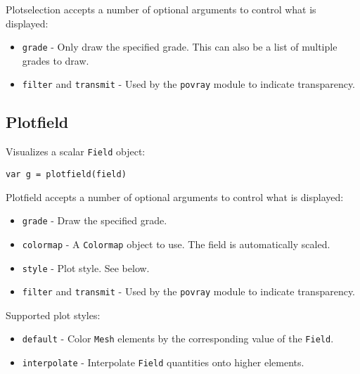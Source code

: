 Plotselection accepts a number of optional arguments to control what is
displayed:

\begin{itemize}

\item
  \texttt{grade} - Only draw the specified grade. This can also be a
  list of multiple grades to draw.
\item
  \texttt{filter} and \texttt{transmit} - Used by the \texttt{povray}
  module to indicate transparency.
\end{itemize}

\hypertarget{plotfield}{%
\subsection{Plotfield}\label{plotfield}}

Visualizes a scalar \texttt{Field} object:

\begin{lstlisting}
var g = plotfield(field)
\end{lstlisting}

Plotfield accepts a number of optional arguments to control what is
displayed:

\begin{itemize}

\item
  \texttt{grade} - Draw the specified grade.
\item
  \texttt{colormap} - A \texttt{Colormap} object to use. The field is
  automatically scaled.
\item
  \texttt{style} - Plot style. See below.
\item
  \texttt{filter} and \texttt{transmit} - Used by the \texttt{povray}
  module to indicate transparency.
\end{itemize}

Supported plot styles:

\begin{itemize}

\item
  \texttt{default} - Color \texttt{Mesh} elements by the corresponding
  value of the \texttt{Field}.
\item
  \texttt{interpolate} - Interpolate \texttt{Field} quantities onto
  higher elements.
\end{itemize}
